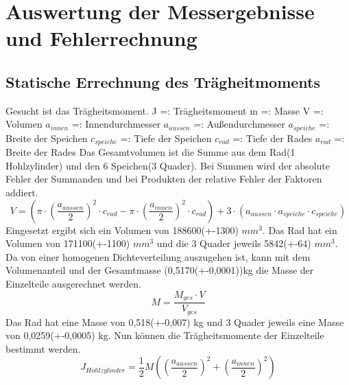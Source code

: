 \newpage
\section{ Auswertung der Messergebnisse und Fehlerrechnung}

\subsection{Statische Errechnung des Trägheitmoments}
Gesucht ist das Trägheitsmoment.
\newline
J =: Trägheitsmoment
\newline
m =: Masse
\newline
V =: Volumen
\newline
$a_{innen}$ =: Innendurchmesser
\newline
$a_{aussen}$ =: Außendurchmesser
\newline
$a_{speiche}$ =: Breite der Speichen
\newline
$c_{speiche}$ =: Tiefe der Speichen
\newline
$c_{rad}$ =: Tiefe der Rades
\newline
$a_{rad}$ =: Breite der Rades
\newline
Das Gesamtvolumen ist die Summe aus dem Rad(1 Hohlzylinder) und den 6 Speichen(3 Quader). Bei Summen wird der absolute Fehler der Summanden und bei Produkten der relative Fehler der Faktoren addiert.
\begin{equation}
V = (\pi \cdot (\frac{a_{aussen}}{2})^{2}\cdot c_{rad}-\pi \cdot (\frac{a_{innen}}{2})^{2}\cdot c_{rad})+3\cdot (a_{aussen}\cdot a_{speiche}\cdot c_{speiche})
\end{equation}
Eingesetzt ergibt sich ein Volumen von 188600(+-1300) $mm^{3}$. Das Rad hat ein Volumen von 171100(+-1100) $mm^{3}$ und die 3 Quader jeweils 5842(+-64) $mm^{3}$. Da von einer homogenen Dichteverteilung auszugehen ist, kann mit dem Volumenanteil und der Gesamtmasse (0,5170(+-0,0001))kg die Masse der Einzelteile ausgerechnet werden.
\begin{equation}
M = \frac{M_{ges}\cdot V}{V_{ges}}
\end{equation}
Das Rad hat eine Masse von 0,518(+-0,007) kg und 3 Quader jeweils eine Masse von 0,0259(+-0,0005) kg.
\newline
Nun können die Trägheitsmomente der Einzelteile bestimmt werden.
\begin{equation}
J_{Hohlzylinder} = \frac{1}{2}M((\frac{a_{aussen}}{2})^{2}+(\frac{a_{innen}}{2})^{2})
\end{equation}
